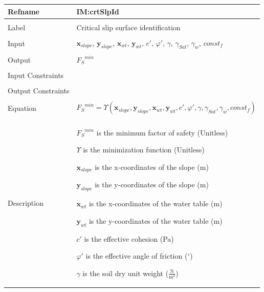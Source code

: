 \documentclass[12pt]{article}
\begin{document}
\noindent \begin{minipage}{\textwidth}
\begin{tabular}{p{} p{}}
\toprule \textbf{Refname} & \textbf{IM:crtSlpId}
\label{IM:crtSlpId}
\\ \midrule \\
Label & Critical slip surface identification
\\ \midrule \\
Input & ${\mathbf{x}_{slope}}$, ${\mathbf{y}_{slope}}$, ${\mathbf{x}_{wt}}$, ${\mathbf{y}_{wt}}$, $c'$, $φ'$, $γ$, ${γ_{Sat}}$, ${γ_{w}}$, $const_f$
\\ \midrule \\
Output & ${{F_{S}}^{min}}$
\\ \midrule \\
Input Constraints & 
\\ \midrule \\
Output Constraints & 
\\ \midrule \\
Equation & \begin{displaymath}
           {{F_{S}}^{min}}=Υ\left({\mathbf{x}_{slope}},{\mathbf{y}_{slope}},{\mathbf{x}_{wt}},{\mathbf{y}_{wt}},c',φ',γ,{γ_{Sat}},{γ_{w}},const_f\right)
           \end{displaymath}
\\ \midrule \\
Description & \begin{symbDescription}
              \item{${{F_{S}}^{min}}$ is the minimum factor of safety (Unitless)}
              \item{$Υ$ is the minimization function (Unitless)}
              \item{${\mathbf{x}_{slope}}$ is the x-coordinates of the slope (m)}
              \item{${\mathbf{y}_{slope}}$ is the y-coordinates of the slope (m)}
              \item{${\mathbf{x}_{wt}}$ is the x-coordinates of the water table (m)}
              \item{${\mathbf{y}_{wt}}$ is the y-coordinates of the water table (m)}
              \item{$c'$ is the effective cohesion (Pa)}
              \item{$φ'$ is the effective angle of friction (${}^{\circ}$)}
              \item{$γ$ is the soil dry unit weight ($\frac{\text{N}}{\text{m}^{3}}$)}

\end{symbDescription}
\end{tabular}
\end{minipage}
\end{document}
